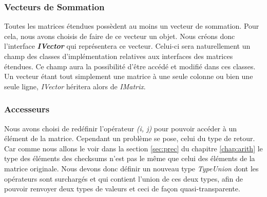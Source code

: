 \documentclass[a4paper, 10pt]{report}
\begin{document}
\subsubsection{Vecteurs de Sommation}
Toutes les matrices étendues possèdent au moins un vecteur de sommation. Pour cela, nous avons choisis de faire de 
ce vecteur un objet. Nous créons donc l’interface \textbf{\textit {IVector}} qui représentera ce vecteur. Celui-ci sera 
naturellement un champ des classes d’implémentation relatives aux interfaces des matrices étendues. Ce champ aura la 
possibilité d’être accédé et modifié dans ces classes. Un vecteur étant tout simplement une matrice à une seule colonne 
ou bien une seule ligne, \textit{IVector} héritera alors de \textit{IMatrix}.

\subsubsection{Accesseurs}
Nous avons choisi de redéfinir l'opérateur \textit{(i, j)} pour pouvoir accéder à un élément de la matrice.
Cependant un problème se pose, celui du type de retour.
Car comme nous allons le voir dans la section \ref{sec:prec} du chapitre \ref{chap:arith} le type des éléments des checksums n'est pas le
m\^eme que celui des éléments de la matrice originale.
Nous devons donc définir un nouveau type \textit{TypeUnion} dont les opérateurs sont surchargés et qui contient
l'union de ces deux types, afin de pouvoir renvoyer deux types de valeurs et ceci de façon quasi-transparente.
\end{document}
